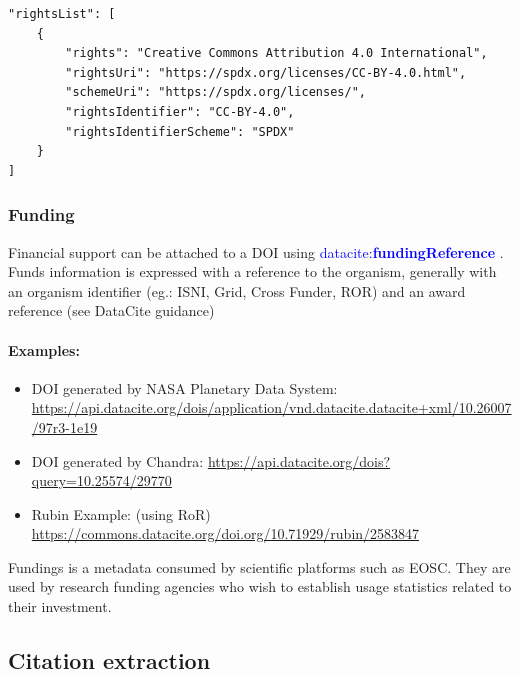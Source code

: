 \documentclass[11pt,a4paper]{ivoa}
\newcommand{\dataciteterm}[1]{\textcolor{blue}{\mbox{datacite:\textbf{#1}}}}
\begin{document}
\begin{lstlisting}
"rightsList": [
    {
        "rights": "Creative Commons Attribution 4.0 International",
        "rightsUri": "https://spdx.org/licenses/CC-BY-4.0.html",
        "schemeUri": "https://spdx.org/licenses/",
        "rightsIdentifier": "CC-BY-4.0",
        "rightsIdentifierScheme": "SPDX"
    }
]
\end{lstlisting}

\subsubsection{Funding}\hypertarget{fundings}{}\label{fundings}

Financial support can be attached to a DOI using \dataciteterm{fundingReference} . Funds information is expressed with a reference to the organism, generally with an organism identifier (eg.: ISNI, Grid, Cross Funder, ROR) and an award reference (see DataCite guidance)\\

\paragraph{Examples:}
\begin{itemize}
\item DOI generated by NASA Planetary Data System: \newline
\href{https://api.datacite.org/dois/application/vnd.datacite.datacite+xml/10.26007/97r3-1e19}{https://api.datacite.org/dois/application/vnd.datacite.datacite+xml/10.26007/97r3-1e19}

\item DOI generated by Chandra:\newline
\href{https://api.datacite.org/dois?query=10.25574/29770}{https://api.datacite.org/dois?query=10.25574/29770}

\item Rubin Example: (using RoR)\newline
\href{https://commons.datacite.org/doi.org/10.71929/rubin/2583847}{https://commons.datacite.org/doi.org/10.71929/rubin/2583847}
\end{itemize}

Fundings is a metadata consumed by scientific platforms  such as EOSC.  They are used by research funding agencies who wish to establish usage statistics related to their investment.

\subsection{Citation extraction}\hypertarget{citation-extraction}{}\label{sec:citation-extraction}
\end{document}
